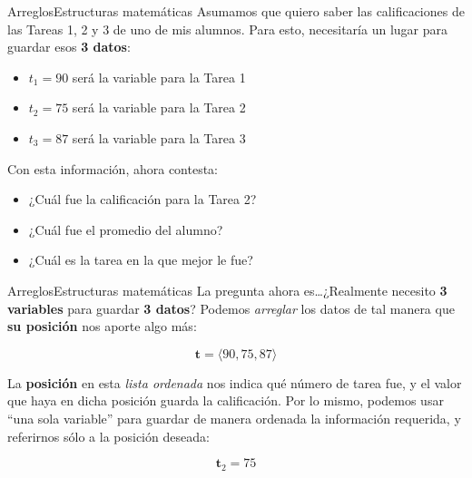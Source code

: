 \documentclass[spanish, c]{beamer}
\begin{document}
\begin{frame}{Arreglos}{Estructuras matemáticas}
    Asumamos que quiero saber las calificaciones de las Tareas 1, 2 y 3 de uno de mis alumnos.
    Para esto, necesitaría un lugar para guardar esos \textbf{3 datos}: \pause

    \bigskip

    \begin{itemize}[<+->]
        \item $t_1 = 90$ será la variable para la Tarea 1
        \item $t_2 = 75$ será la variable para la Tarea 2
        \item $t_3 = 87$ será la variable para la Tarea 3
    \end{itemize} \pause

    \bigskip

    Con esta información, ahora contesta:

    \begin{itemize}[<+->]
        \item ¿Cuál fue la calificación para la Tarea 2?
        \item ¿Cuál fue el promedio del alumno?
        \item ¿Cuál es la tarea en la que mejor le fue?
    \end{itemize}
\end{frame}

\begin{frame}{Arreglos}{Estructuras matemáticas}
    La pregunta ahora es\dots ¿Realmente necesito \textbf{3 variables} para guardar \textbf{3 datos}?
    Podemos \textit{arreglar} los datos de tal manera que \textbf{su posición} nos aporte algo más: \pause

    $$\mathbf{t} = \langle 90, 75, 87 \rangle$$ \pause

    La \textbf{posición} en esta \textit{lista ordenada} nos indica qué número de tarea fue, y el valor que haya en dicha posición guarda la calificación. Por lo mismo, podemos usar ``una sola variable'' para guardar de manera ordenada la información requerida, y referirnos sólo a la posición deseada:

    $$\mathbf{t}_2 = 75$$
\end{frame}
\end{document}
